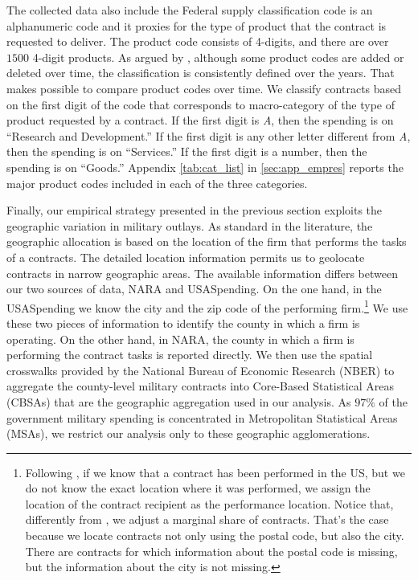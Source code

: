 \documentclass[dv_diss_main.tex]{subfiles}
\begin{document}
The collected data also include the Federal supply classification code is an alphanumeric code and it proxies for the type of product that the contract is requested to deliver. The product code consists of 4-digits, and there are over $1500$ 4-digit products. As argued by \cite{Draca2013}, although some product codes are added or deleted over time, the classification is consistently defined over the years. That makes possible to compare product codes over time. We classify contracts based on the first digit of the code that corresponds to macro-category of the type of product requested by a contract. If the first digit is \textit{A}, then the spending is on ``Research and Development.'' If the first digit is any other letter different from \textit{A}, then the spending is on ``Services.'' If the first digit is a number, then the spending is on ``Goods.'' Appendix \ref{tab:cat_list} in \ref{sec:app_empres} reports the major product codes included in each of the three categories.

Finally, our empirical strategy presented in the previous section exploits the geographic variation in military outlays. As standard in the literature, the geographic allocation is based on the location of the firm that performs the tasks of a contracts. The detailed location information permits us to geolocate contracts in narrow geographic areas. The available information differs between our two sources of data, NARA and USASpending. On the one hand, in the USASpending we know the city and the zip code of the performing firm.\footnote{Following  \cite{Demyanyk2019}, if we know that a contract has been performed in the US, but we do not know the exact location where it was performed, we assign the location of the contract recipient as the performance location. Notice that, differently from \cite{Demyanyk2019}, we adjust a marginal share of contracts. That's the case because we locate contracts not only using the postal code, but also the city. There are contracts for which information about the postal code is missing, but the information about the city is not missing.} We use these two pieces of information to identify the county in which a firm is operating. On the other hand, in NARA, the county in which a firm is performing the contract tasks is reported directly. We then use the spatial crosswalks provided by the National Bureau of Economic Research (NBER) to aggregate the county-level military contracts into Core-Based Statistical Areas (CBSAs) that are the geographic aggregation used in our analysis. As $97\%$ of the government military spending is concentrated in Metropolitan Statistical Areas (MSAs), we restrict our analysis only to these geographic agglomerations.
\end{document}
